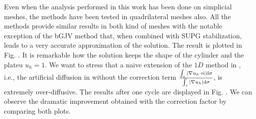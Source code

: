 %
%
%




Even when the analysis performed in this work has been done on simplicial meshes, the methods have been tested in quadrilateral meshes also. All the methods provide similar results in both kind of meshes with the notable exception of the bGJV method that, when combined with SUPG stabilization, leads to a very accurate approximation of the solution. The result is plotted in Fig. . It is remarkable how the solution keeps the shape of the cylinder and the plateu $u_h=1$. We want to stress that a naive extension of the $1D$ method in \cite{burman_nonlinear_2007}, i.e., the artificial diffusion in  without the correction term $\frac{\int_e |\nabla u_h \cdot n|{\rm d} \sigma}{\int_e |\nabla u_h| {\rm d} \sigma}$, is extremely over-diffusive. The results after one cycle are displayed in Fig.  . We can observe the dramatic improvement obtained with the correction factor by comparing both plots.


